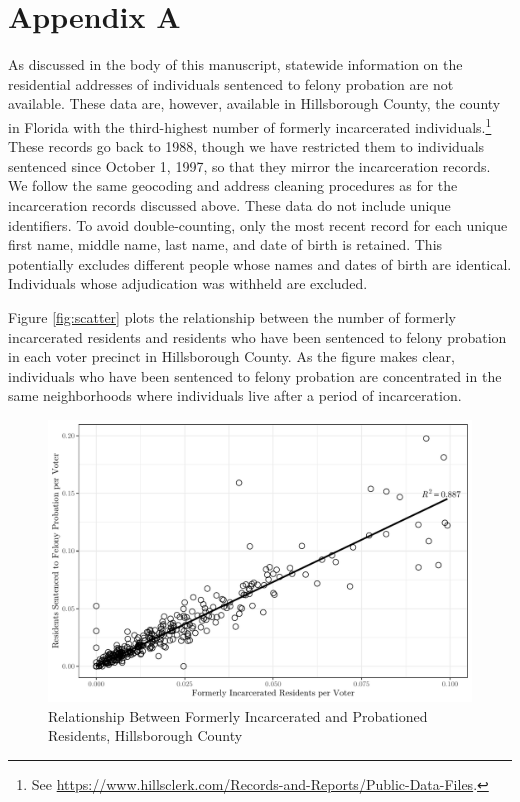 \documentclass[
  12pt,
]{article}
\begin{document}
\newpage

\hypertarget{appendix-a}{%
\section*{Appendix A}\label{appendix-a}}

As discussed in the body of this manuscript, statewide information on the residential addresses of individuals sentenced to felony probation are not available. These data are, however, available in Hillsborough County, the county in Florida with the third-highest number of formerly incarcerated individuals.\footnote{See \url{https://www.hillsclerk.com/Records-and-Reports/Public-Data-Files}.} These records go back to 1988, though we have restricted them to individuals sentenced since October 1, 1997, so that they mirror the incarceration records. We follow the same geocoding and address cleaning procedures as for the incarceration records discussed above. These data do not include unique identifiers. To avoid double-counting, only the most recent record for each unique first name, middle name, last name, and date of birth is retained. This potentially excludes different people whose names and dates of birth are identical. Individuals whose adjudication was withheld are excluded.

Figure \ref{fig:scatter} plots the relationship between the number of formerly incarcerated residents and residents who have been sentenced to felony probation in each voter precinct in Hillsborough County. As the figure makes clear, individuals who have been sentenced to felony probation are concentrated in the same neighborhoods where individuals live after a period of incarceration.

\begin{figure}[H]

{\centering \includegraphics{amendment_4_turnout_files/figure-latex/corrplot-1} 

}

\caption{\label{fig:scatter}Relationship Between Formerly Incarcerated and Probationed Residents, Hillsborough County}\label{fig:corrplot}
\end{figure}
\end{document}
